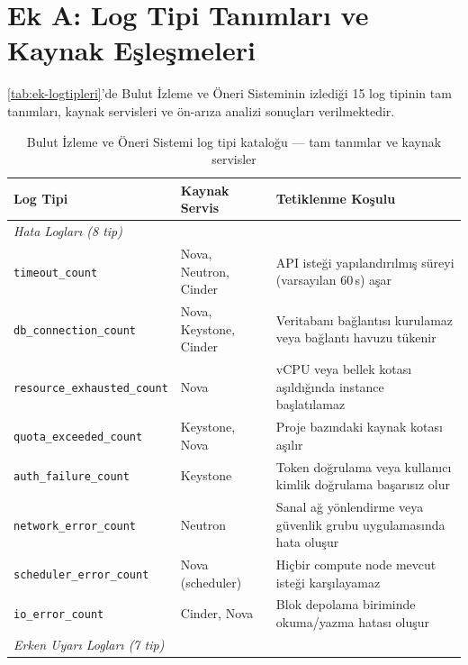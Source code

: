 \begin{ekler}
\label{ch:ekA}

\section*{Ek A: Log Tipi Tanımları ve Kaynak Eşleşmeleri}

\autoref{tab:ek-logtipleri}'de Bulut İzleme ve Öneri Sisteminin izlediği 15 log tipinin tam tanımları, kaynak servisleri ve ön-arıza analizi sonuçları verilmektedir.

\begin{table}[htbp]
    \centering
    \caption{Bulut İzleme ve Öneri Sistemi log tipi kataloğu — tam tanımlar ve kaynak servisler}
    \label{tab:ek-logtipleri}
    \begin{tabular}{p{4.2cm}p{2.8cm}p{6.2cm}}
        \textbf{Log Tipi} & \textbf{Kaynak Servis} & \textbf{Tetiklenme Koşulu} \\
        \hline
        \multicolumn{3}{l}{\textit{Hata Logları (8 tip)}} \\
        \hline
        \texttt{timeout\_count}              & Nova, Neutron, Cinder  & API isteği yapılandırılmış süreyi (varsayılan 60\,s) aşar \\
        \texttt{db\_connection\_count}        & Nova, Keystone, Cinder & Veritabanı bağlantısı kurulamaz veya bağlantı havuzu tükenir \\
        \texttt{resource\_exhausted\_count}   & Nova                   & vCPU veya bellek kotası aşıldığında instance başlatılamaz \\
        \texttt{quota\_exceeded\_count}       & Keystone, Nova         & Proje bazındaki kaynak kotası aşılır \\
        \texttt{auth\_failure\_count}         & Keystone               & Token doğrulama veya kullanıcı kimlik doğrulama başarısız olur \\
        \texttt{network\_error\_count}        & Neutron                & Sanal ağ yönlendirme veya güvenlik grubu uygulamasında hata oluşur \\
        \texttt{scheduler\_error\_count}      & Nova (scheduler)       & Hiçbir compute node mevcut isteği karşılayamaz \\
        \texttt{io\_error\_count}             & Cinder, Nova           & Blok depolama biriminde okuma/yazma hatası oluşur \\
        \hline
        \multicolumn{3}{l}{\textit{Erken Uyarı Logları (7 tip)}} \\

\end{tabular}
\end{table}
\end{ekler}
